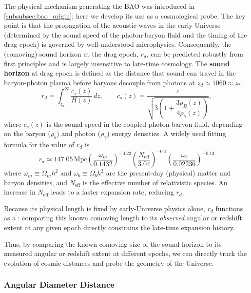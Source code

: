 The physical mechanism generating the BAO was introduced in \cref{subsubsec:bao_origin}; here we develop its use as a cosmological probe. The key point is that the propagation of the acoustic waves in the early Universe (determined by the sound speed of the photon-baryon fluid and the timing of the drag epoch) is governed by well-understood microphysics. Consequently, the (comoving) sound horizon at the drag epoch, $r_d$, can be predicted robustly from first principles and is largely insensitive to late-time cosmology. The \textbf{sound horizon} at drag epoch is defined as the distance that sound can travel in the baryon-photon plasma before baryons decouple from photons at $z_d \approx 1060 \approx z_*$:
\medskip
$$
r_d = \int_{z_d}^{\infty} \frac{c_s(z)}{H(z)}\,dz , \qquad
c_s(z) = \frac{c}{\sqrt{3\left(1 + \dfrac{3\rho_B(z)}{4\rho_\gamma(z)}\right)}} ,
$$
where $c_s(z)$ is the sound speed in the coupled photon-baryon fluid, depending on the baryon ($\rho_b$) and photon ($\rho_\gamma$) energy densities. A widely used fitting formula for the value of $r_d$ is
\medskip
$$
r_d \simeq 147.05\,\mathrm{Mpc} \left(\frac{\omega_m}{0.1432}\right)^{-0.23} \left(\frac{N_{\text{eff}}}{3.04}\right)^{-0.1} \left(\frac{\omega_b}{0.02236}\right)^{-0.13}
$$
where $\omega_m \equiv \Omega_m h^2$ and $\omega_b \equiv \Omega_b h^2$ are the present-day (physical) matter and baryon densities, and $N_{\text{eff}}$ is the effective number of relativistic species. An increase in $N_{\text{eff}}$ leads to a faster expansion rate, reducing $r_d$.

\medskip

Because its physical length is fixed by early-Universe physics alone, $r_d$ functions as a : comparing this known comoving length to its \textit{observed} angular or redshift extent at any given epoch directly constrains the late-time expansion history.

Thus, by comparing the known comoving size of the sound horizon to its measured angular or redshift extent at different epochs, we can directly track the evolution of cosmic distances and probe the geometry of the Universe.

\subsubsection{Angular Diameter Distance}

